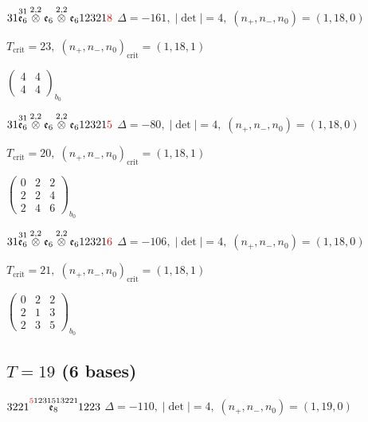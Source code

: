 \documentclass[10pt]{article}
\begin{document}
$31\overset{31}{\mathfrak{e}_6}\overset{2,2}{\otimes}\mathfrak{e}_6\overset{2,2}{\otimes}\mathfrak{e}_612321\textcolor{red}{8}$ \quad $\Delta=-161,\; |\det|=4,\; (n_+,n_-,n_0)=(1,18,0)$

\hspace{1em}$T_{\text{crit}}=23,\; (n_+,n_-,n_0)_{\text{crit}}=(1,18,1)$

\hspace{2em}$\left(\begin{smallmatrix}4 & 4 \\ 4 & 4\end{smallmatrix}\right)_{\!b_0}$

$31\overset{31}{\mathfrak{e}_6}\overset{2,2}{\otimes}\mathfrak{e}_6\overset{2,2}{\otimes}\mathfrak{e}_612321\textcolor{red}{5}$ \quad $\Delta=-80,\; |\det|=4,\; (n_+,n_-,n_0)=(1,18,0)$

\hspace{1em}$T_{\text{crit}}=20,\; (n_+,n_-,n_0)_{\text{crit}}=(1,18,1)$

\hspace{2em}$\left(\begin{smallmatrix}0 & 2 & 2 \\ 2 & 2 & 4 \\ 2 & 4 & 6\end{smallmatrix}\right)_{\!b_0}$

$31\overset{31}{\mathfrak{e}_6}\overset{2,2}{\otimes}\mathfrak{e}_6\overset{2,2}{\otimes}\mathfrak{e}_612321\textcolor{red}{6}$ \quad $\Delta=-106,\; |\det|=4,\; (n_+,n_-,n_0)=(1,18,0)$

\hspace{1em}$T_{\text{crit}}=21,\; (n_+,n_-,n_0)_{\text{crit}}=(1,18,1)$

\hspace{2em}$\left(\begin{smallmatrix}0 & 2 & 2 \\ 2 & 1 & 3 \\ 2 & 3 & 5\end{smallmatrix}\right)_{\!b_0}$


\subsection*{$T = 19$ \quad (6 bases)}
\smallskip

$3221\overset{\textcolor{red}{5}1231513221}{\mathfrak{e}_8}1223$ \quad $\Delta=-110,\; |\det|=4,\; (n_+,n_-,n_0)=(1,19,0)$
\end{document}
